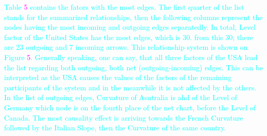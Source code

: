 \documentclass[12pt,bibliography=totoc]{article}
\begin{document}

\textcolor{cyan}{Table \textcolor{magenta}{5} contains the fators with the most edges. The first quarter of the list stands for the summarized relationships, then the following columns represent the nodes having the most incoming and outgoing edges separatedly. In total, Level factor of the United States has the most edges, which is 30. from this 30, there are 23 outgoing and 7 incoming arrows. This relationship system is shown on Figure \textcolor{magenta}{5}. Generally speaking, one can say, that all three factors of the USA lead the list regarding both outgoing, both net (outgoing-incoming) edges. This can be interpreted as the USA causes the values of the factors of the remaining participants of the system and in the meanwhile it is not affected by the others. In the list of outgoing edges, Curvature of Asutralia is ahd of the Level of Germany which node is on the fourth place of the net chart, before the Level of Canada. The most causality effect is arriving towards the French Curvature followed by the Italian Slope, then the Curvature of the same country.}


\end{document}
